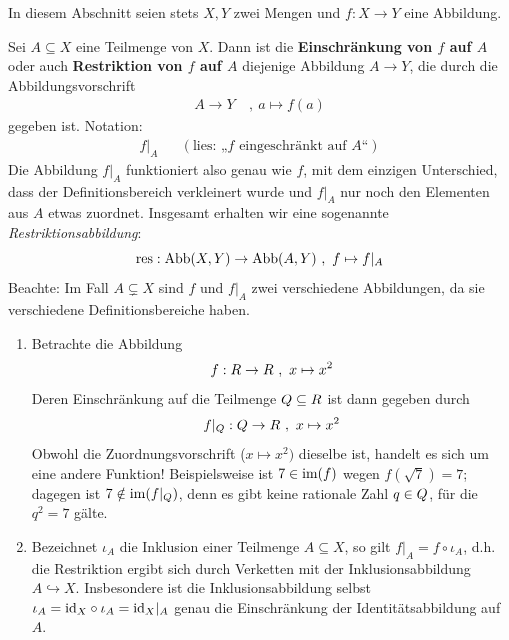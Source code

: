In diesem Abschnitt seien stets $X,Y$ zwei Mengen und $f:X\to Y$ eine Abbildung.


\begin{defin} \label{def:quelleschrank} 
    Sei $A \subseteq X$ eine Teilmenge von $X$. Dann ist die \textbf{Einschränkung von $f$ auf $A$} oder auch \textbf{Restriktion von $f$ auf $A$} diejenige Abbildung $A\to Y$, die durch die Abbildungsvorschrift
    \begin{align*}
        A \to Y \ &,\ a \mapsto f(a)
    \end{align*}
    gegeben ist. Notation:
    \begin{align*}
        f\vert_A && (\text{lies: „$f$ eingeschränkt auf $A$“})
    \end{align*}
    Die Abbildung $f\vert_{A}$ funktioniert also genau wie $f$, mit dem einzigen Unterschied, dass der Definitionsbereich verkleinert wurde und $f\vert_{A}$ nur noch den Elementen aus $A$ etwas zuordnet. Insgesamt erhalten wir eine sogenannte \emph{Restriktionsabbildung}:
        \[ \operatorname{res} : \operatorname{Abb}(X,Y) \to \operatorname{Abb}(A,Y) \ ,\ f \mapsto f\vert_A \]
    Beachte: Im Fall $A\subsetneq X$ sind $f$ und $f\vert_A$ zwei verschiedene Abbildungen, da sie verschiedene Definitionsbereiche haben.
\end{defin}


\begin{bsp} \label{bsp:quelleschrank} \quad
    \begin{enumerate}
    \item Betrachte die Abbildung
        \[ f : \relax R \to \relax R \ ,\ x \mapsto x^2 \]
    Deren Einschränkung auf die Teilmenge $\relax Q\subseteq \relax R$ ist dann gegeben durch
        \[ f\vert_{\relax Q} : \relax Q \to \relax R \ ,\ x\mapsto x^2 \]
    Obwohl die Zuordnungsvorschrift ($x\mapsto x^2)$ dieselbe ist, handelt es sich um eine andere Funktion! Beispielsweise ist $7\in \operatorname{im}(f)$ wegen $f(\sqrt{7})=7$; dagegen ist $7\notin \operatorname{im}(f\vert_\relax Q)$, denn es gibt keine rationale Zahl $q\in \relax Q$, für die $q^2=7$ gälte.
    \item Bezeichnet $\iota_A$ die Inklusion einer Teilmenge $A\subseteq X$, so gilt $f\vert_A = f\circ\iota_A$, d.h. die Restriktion ergibt sich durch Verketten mit der Inklusionsabbildung $A\hookrightarrow X$. Insbesondere ist die Inklusionsabbildung selbst $\iota_A = \mathrm{id}_X\circ \iota_A = \mathrm{id}_X \vert_A$ genau die Einschränkung der Identitätsabbildung auf $A$.
    \end{enumerate}
\end{bsp}
 
